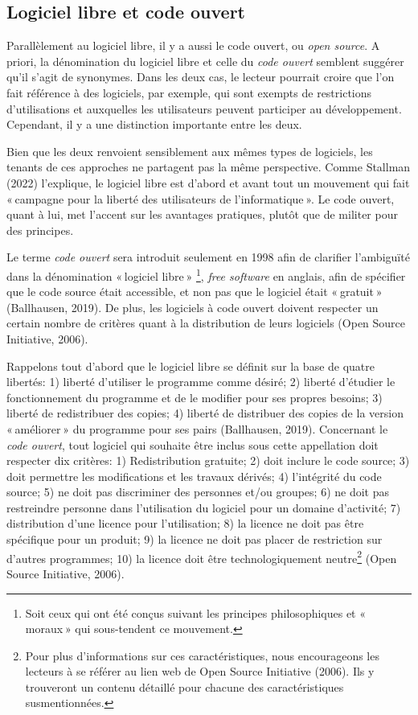 \documentclass[
  letterpaper,
  DIV=11,
  numbers=noendperiod]{scrreprt}
\begin{document}
\subsection{Logiciel libre et code
ouvert}\label{logiciel-libre-et-code-ouvert}

Parallèlement au logiciel libre, il y a aussi le code ouvert, ou
\emph{open source}. A priori, la dénomination du logiciel libre et celle
du \emph{code ouvert} semblent suggérer qu'il s'agit de synonymes. Dans
les deux cas, le lecteur pourrait croire que l'on fait référence à des
logiciels, par exemple, qui sont exempts de restrictions d'utilisations
et auxquelles les utilisateurs peuvent participer au développement.
Cependant, il y a une distinction importante entre les deux.

Bien que les deux renvoient sensiblement aux mêmes types de logiciels,
les tenants de ces approches ne partagent pas la même perspective. Comme
Stallman (2022) l'explique, le logiciel libre est d'abord et avant tout
un mouvement qui fait « campagne pour la liberté des utilisateurs de
l'informatique ». Le code ouvert, quant à lui, met l'accent sur les
avantages pratiques, plutôt que de militer pour des principes.

Le terme \emph{code ouvert} sera introduit seulement en 1998 afin de
clarifier l'ambiguïté dans la dénomination « logiciel libre »
\footnote{Soit ceux qui ont été conçus suivant les principes
  philosophiques et « moraux » qui sous-tendent ce mouvement.},
\emph{free software} en anglais, afin de spécifier que le code source
était accessible, et non pas que le logiciel était « gratuit »
(Ballhausen, 2019). De plus, les logiciels à code ouvert doivent
respecter un certain nombre de critères quant à la distribution de leurs
logiciels (Open Source Initiative, 2006).

Rappelons tout d'abord que le logiciel libre se définit sur la base de
quatre libertés: 1) liberté d'utiliser le programme comme désiré; 2)
liberté d'étudier le fonctionnement du programme et de le modifier pour
ses propres besoins; 3) liberté de redistribuer des copies; 4) liberté
de distribuer des copies de la version « améliorer » du programme pour
ses pairs (Ballhausen, 2019). Concernant le \emph{code ouvert}, tout
logiciel qui souhaite être inclus sous cette appellation doit respecter
dix critères: 1) Redistribution gratuite; 2) doit inclure le code
source; 3) doit permettre les modifications et les travaux dérivés; 4)
l'intégrité du code source; 5) ne doit pas discriminer des personnes
et/ou groupes; 6) ne doit pas restreindre personne dans l'utilisation du
logiciel pour un domaine d'activité; 7) distribution d'une licence pour
l'utilisation; 8) la licence ne doit pas être spécifique pour un
produit; 9) la licence ne doit pas placer de restriction sur d'autres
programmes; 10) la licence doit être technologiquement neutre\footnote{Pour
  plus d'informations sur ces caractéristiques, nous encourageons les
  lecteurs à se référer au lien web de Open Source Initiative (2006).
  Ils y trouveront un contenu détaillé pour chacune des caractéristiques
  susmentionnées.} (Open Source Initiative, 2006).
\end{document}
